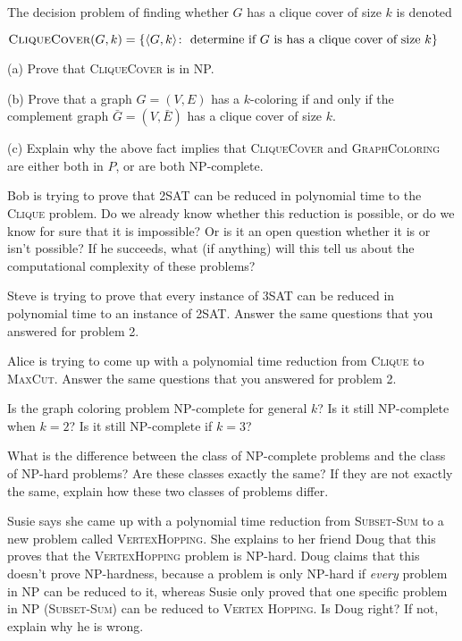 \documentclass[11  pt]{exam}
\begin{document}
	\begin{questions}
		
		\question 
		The decision problem of finding whether $G$ has a clique cover of size $k$ is denoted
		\begin{center}
			$\textsc{CliqueCover}(G,k) = \{ \langle G, k \rangle \colon \text{ determine if $G$ is has a clique cover of size $k$}\}$
		\end{center}
		
		
		(a) Prove that \textsc{CliqueCover} is in NP.
		
		(b) Prove that a graph $G = (V,E)$ has a $k$-coloring if and only if the complement graph $\bar{G} = (V, \bar{E})$ has a clique cover of size $k$.
		
		(c) Explain why the above fact implies that \textsc{CliqueCover} and \textsc{GraphColoring} are either both in $P$, or are both NP-complete.
		

	\question Bob is trying to prove that 2SAT can be reduced in polynomial time to the \textsc{Clique} problem. Do we already know whether this reduction is possible, or do we know for sure that it is impossible? Or is it an open question whether it is or isn't possible?  If he succeeds, what (if anything) will this tell us about the computational complexity of these problems? 
	
	\question Steve is trying to prove that every instance of 3SAT can be reduced in polynomial time to an instance of 2SAT.  Answer the same questions that you answered for problem 2.
	
	\question Alice is trying to come up with a polynomial time reduction from \textsc{Clique} to \textsc{MaxCut}. Answer the same questions that you answered for problem 2.
	
	\question Is the graph coloring problem NP-complete for general $k$? Is it still NP-complete when $k = 2$? Is it still NP-complete if $k = 3$?
	
	\question What is the difference between the class of NP-complete problems and the class of NP-hard problems? Are these classes exactly the same? If they are not exactly the same, explain how these two classes of problems differ.
	
	\question Susie says she came up with a polynomial time reduction from \textsc{Subset-Sum} to a new problem called \textsc{VertexHopping}. She explains to her friend Doug that this proves that the \textsc{VertexHopping} problem is NP-hard. Doug claims that this doesn't prove NP-hardness, because a problem is only NP-hard if \emph{every} problem in NP can be reduced to it, whereas Susie only proved that one specific problem in NP (\textsc{Subset-Sum}) can be reduced to \textsc{Vertex Hopping}. Is Doug right? If not, explain why he is wrong.


\end{questions}
\end{document}
